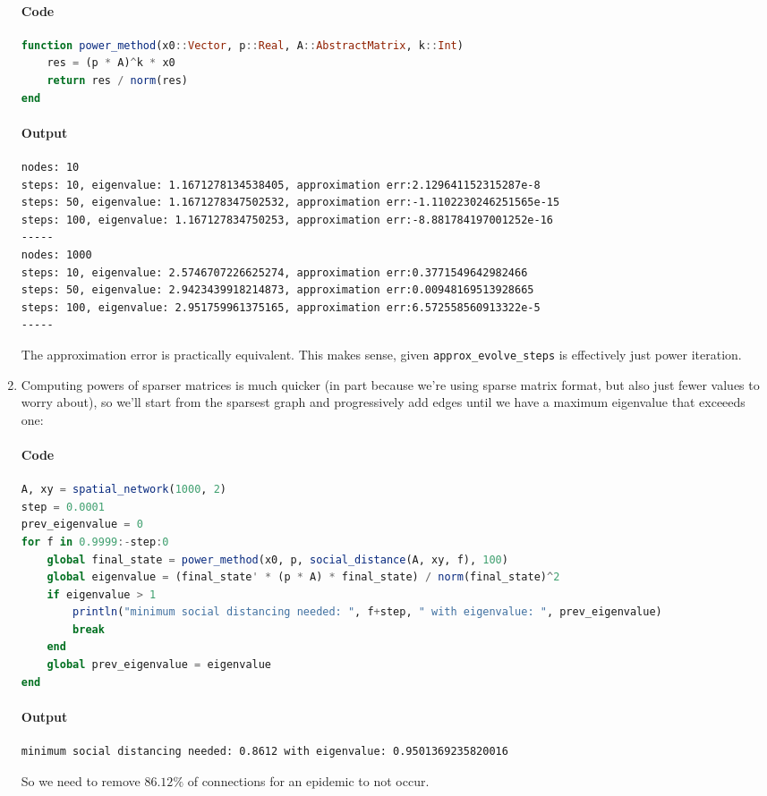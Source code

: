 \documentclass[]{exam}
\let\oldparagraph\paragraph
\renewcommand{\paragraph}[1]{\oldparagraph{#1}\mbox{}}
\begin{document}
\begin{questions}
\begin{enumerate}[label=\arabic*.]
		\paragraph{Code}
		\begin{lstlisting}[language=julia]
function power_method(x0::Vector, p::Real, A::AbstractMatrix, k::Int)
	res = (p * A)^k * x0
	return res / norm(res)
end
		\end{lstlisting}
		\paragraph{Output}
		\begin{lstlisting}
nodes: 10
steps: 10, eigenvalue: 1.1671278134538405, approximation err:2.129641152315287e-8
steps: 50, eigenvalue: 1.1671278347502532, approximation err:-1.1102230246251565e-15
steps: 100, eigenvalue: 1.167127834750253, approximation err:-8.881784197001252e-16
-----
nodes: 1000
steps: 10, eigenvalue: 2.5746707226625274, approximation err:0.3771549642982466
steps: 50, eigenvalue: 2.9423439918214873, approximation err:0.00948169513928665
steps: 100, eigenvalue: 2.951759961375165, approximation err:6.572558560913322e-5
-----
		\end{lstlisting}
		The approximation error is practically equivalent. This makes sense, given \texttt{approx\_evolve\_steps} is effectively just power iteration.
	\item Computing powers of sparser matrices is much quicker (in part because we're using sparse matrix format, but also just fewer values to worry about), so we'll start from the sparsest graph and progressively add edges until we have a maximum eigenvalue that exceeeds one:
		\paragraph{Code}
		\begin{lstlisting}[language=julia]
A, xy = spatial_network(1000, 2)
step = 0.0001
prev_eigenvalue = 0
for f in 0.9999:-step:0
	global final_state = power_method(x0, p, social_distance(A, xy, f), 100)
	global eigenvalue = (final_state' * (p * A) * final_state) / norm(final_state)^2
	if eigenvalue > 1
		println("minimum social distancing needed: ", f+step, " with eigenvalue: ", prev_eigenvalue)
		break
	end
	global prev_eigenvalue = eigenvalue
end
		\end{lstlisting}
		\paragraph{Output}
		\begin{lstlisting}
minimum social distancing needed: 0.8612 with eigenvalue: 0.9501369235820016
		\end{lstlisting}
		So we need to remove $86.12\%$ of connections for an epidemic to not occur.


\end{enumerate}
\end{questions}
\end{document}
